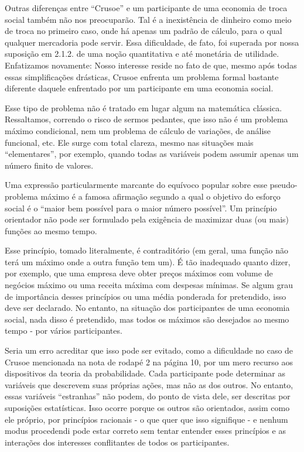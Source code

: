 \documentclass[a4paper,12pt]{article}[abntex2]
\begin{document}
Outras diferenças entre “Crusoe” e um participante de uma economia de troca social também não nos preocuparão. Tal é a inexistência de dinheiro como meio de troca no primeiro caso, onde há apenas um padrão de cálculo, para o qual qualquer mercadoria pode servir. Essa dificuldade, de fato, foi superada por nossa suposição em 2.1.2. de uma noção quantitativa e até monetária de utilidade. Enfatizamos novamente: Nosso interesse reside no fato de que, mesmo após todas essas simplificações drásticas, Crusoe enfrenta um problema formal bastante diferente daquele enfrentado por um participante em uma economia social.

Esse tipo de problema não é tratado em lugar algum na matemática clássica. Ressaltamos, correndo o risco de sermos pedantes, que isso não é um problema máximo condicional, nem um problema de cálculo de variações, de análise funcional, etc. Ele surge com total clareza, mesmo nas situações mais “elementares”, por exemplo, quando todas as variáveis podem assumir apenas um número finito de valores.

Uma expressão particularmente marcante do equívoco popular sobre esse pseudo-problema máximo é a famosa afirmação segundo a qual o objetivo do esforço social é o “maior bem possível para o maior número possível”. Um princípio orientador não pode ser formulado pela exigência de maximizar duas (ou mais) funções ao mesmo tempo.

Esse princípio, tomado literalmente, é contraditório (em geral, uma função não terá um máximo onde a outra função tem um). É tão inadequado quanto dizer, por exemplo, que uma empresa deve obter preços máximos com volume de negócios máximo ou uma receita máxima com despesas mínimas. Se algum grau de importância desses princípios ou uma média ponderada for pretendido, isso deve ser declarado. No entanto, na situação dos participantes de uma economia social, nada disso é pretendido, mas todos os máximos são desejados ao mesmo tempo - por vários participantes.

Seria um erro acreditar que isso pode ser evitado, como a dificuldade no caso de Crusoe mencionada na nota de rodapé 2 na página 10, por um mero recurso aos dispositivos da teoria da probabilidade. Cada participante pode determinar as variáveis que descrevem suas próprias ações, mas não as dos outros. No entanto, essas variáveis “estranhas” não podem, do ponto de vista dele, ser descritas por suposições estatísticas. Isso ocorre porque os outros são orientados, assim como ele próprio, por princípios racionais - o que quer que isso signifique - e nenhum modus procedendi pode estar correto sem tentar entender esses princípios e as interações dos interesses conflitantes de todos os participantes.
\end{document}
